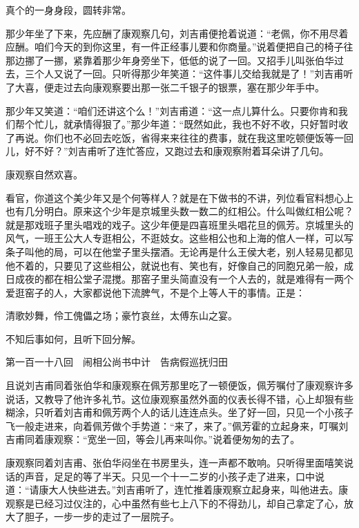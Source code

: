 \documentclass[12pt,UTF8]{ctexbook}
\begin{document}
{{{真个的一身身段，圆转非常。

那少年坐了下来，先应酬了康观察几句，刘吉甫便抢着说道：“老佩，你不用尽着应酬。咱们今天的到你这里，有一件正经事儿要和你商量。”说着便把自己的椅子往那边挪了一挪，紧靠着那少年身旁坐下，低低的说了一回。又招手儿叫张伯华过去，三个人又说了一回。只听得那少年笑道：“这件事儿交给我就是了！”刘吉甫听了大喜，便走过去向康观察要出那一张二千银子的银票，塞在那少年手中。

那少年又笑道：“咱们还讲这个么！”刘吉甫道：“这一点儿算什么。只要你肯和我们帮个忙儿，就承情得狠了。”那少年道：“既然如此，我也不好不收，只好暂时收了再说。你们也不必回去吃饭，省得来来往往的费事，就在我这里吃顿便饭等一回儿，好不好？”刘吉甫听了连忙答应，又跑过去和康观察附着耳朵讲了几句。

康观察自然欢喜。

看官，你道这个美少年又是个何等样人？就是在下做书的不讲，列位看官料想心上也有几分明白。原来这个少年是京城里头数一数二的红相公。什么叫做红相公呢？就是那戏班子里头唱戏的戏子。这少年便是四喜班里头唱花旦的佩芳。京城里头的风气，一班王公大人专逛相公，不逛妓女。这些相公也和上海的倌人一样，可以写条子叫他的局，可以在他堂子里头摆酒。无论再是什么王侯大老，别人轻易见都见他不着的，只要见了这些相公，就说也有、笑也有，好像自己的同胞兄弟一般，成日成夜的都在相公堂子混搅。那窑子里头简直没有一个人去的，就是难得有一两个爱逛窑子的人，大家都说他下流脾气，不是个上等人干的事情。正是：

清歌妙舞，伶工傀儡之场；豪竹哀丝，太傅东山之宴。

不知后事如何，且听下回分解。





第一百一十八回　闹相公尚书中计　告病假巡抚归田





且说刘吉甫同着张伯华和康观察在佩芳那里吃了一顿便饭，佩芳嘱付了康观察许多说话，又教导了他许多礼节。这位康观察虽然外面的仪表长得不错，心上却狠有些糊涂，只听着刘吉甫和佩芳两个人的话儿连连点头。坐了好一回，只见一个小孩子飞一般走进来，向着佩芳做个手势道：“来了，来了。”佩芳霍的立起身来，叮嘱刘吉甫同着康观察：“宽坐一回，等会儿再来叫你。”说着便匆匆的去了。

康观察同着刘吉甫、张伯华闷坐在书房里头，连一声都不敢响。只听得里面嘻笑说话的声音，足足的等了半天。只见一个十一二岁的小孩子走了进来，口中说道：“请康大人快些进去。”刘吉甫听了，连忙推着康观察立起身来，叫他进去。康观察是已经习过仪注的，心中虽然有些七上八下的不得劲儿，却自己拿定了心，放大了胆子，一步一步的走过了一层院子。

}}}
\end{document}
